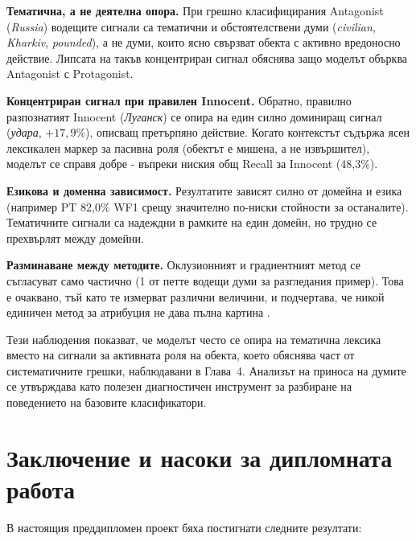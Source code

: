 \documentclass[12pt,a4paper]{report}
\begin{document}
\textbf{Тематична, а не деятелна опора.} При грешно класифицирания Antagonist (\textit{Russia}) водещите сигнали са тематични и обстоятелствени думи (\textit{civilian}, \textit{Kharkiv}, \textit{pounded}), а не думи, които ясно свързват обекта с активно вредоносно действие. Липсата на такъв концентриран сигнал обяснява защо моделът обърква Antagonist с Protagonist.

\textbf{Концентриран сигнал при правилен Innocent.} Обратно, правилно разпознатият Innocent (\textit{Луганск}) се опира на един силно доминиращ сигнал (\textit{удара}, $+17{,}9\%$), описващ претърпяно действие. Когато контекстът съдържа ясен лексикален маркер за пасивна роля (обектът е мишена, а не извършител), моделът се справя добре - въпреки ниския общ Recall за Innocent (48,3\%).

\textbf{Езикова и доменна зависимост.} Резултатите зависят силно от домейна и езика (например PT 82,0\% WF1 срещу значително по-ниски стойности за останалите). Тематичните сигнали са надеждни в рамките на един домейн, но трудно се прехвърлят между домейни.

\textbf{Разминаване между методите.} Оклузионният и градиентният метод се съгласуват само частично (1 от петте водещи думи за разгледания пример). Това е очаквано, тъй като те измерват различни величини, и подчертава, че никой единичен метод за атрибуция не дава пълна картина \cite{jain2019attention}.

Тези наблюдения показват, че моделът често се опира на тематична лексика вместо на сигнали за активната роля на обекта, което обяснява част от систематичните грешки, наблюдавани в Глава~4. Анализът на приноса на думите се утвърждава като полезен диагностичен инструмент за разбиране на поведението на базовите класификатори.


\chapter{Заключение и насоки за дипломната работа}

В настоящия преддипломен проект бяха постигнати следните резултати:
\end{document}
